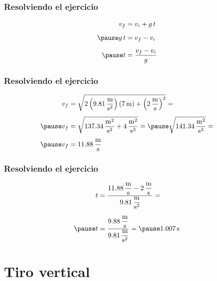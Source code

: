 \documentclass[14pt]{beamer}
\begin{document}
\begin{frame}
\frametitle{Resolviendo el ejercicio}
\vspace*{-1cm}
\begin{eqnarray*}
\begin{aligned}
v_{f} &= v_{i} + g \, t \\[0.5em] \pause
g \, t &= v_{f} - v_{i} \\[0.5em] \pause
t &= \dfrac{v_{f} - v_{i}}{g}
\end{aligned}
\end{eqnarray*}
\end{frame}
\begin{frame}
\frametitle{Resolviendo el ejercicio}
\vspace*{-1.5cm}
\pause
\begin{eqnarray*}
\begin{aligned}
v_{f} &= \sqrt{2 \left( \SI[per-mode=fraction]{9.81}{\meter\per\square\second}  \right) \left( \SI{7}{\meter} \right) + \left( \SI[per-mode=fraction]{2}{\meter\per\second} \right)^{2}} = \\[0.4em] \pause
v_{f} &= \sqrt{\SI[per-mode=fraction]{137.34}{\square\meter\per\square\second} + \SI[per-mode=fraction]{4}{\square\meter\per\square\second}} = \pause \sqrt{\SI[per-mode=fraction]{141.34}{\square\meter\per\square\second}} = \\[0.4em] \pause
v_{f} &= \SI[per-mode=fraction]{11.88}{\meter\per\second}
\end{aligned}
\end{eqnarray*}
\end{frame}
\begin{frame}
\frametitle{Resolviendo el ejercicio}
\pause
\begin{eqnarray*}
\begin{aligned}
t &= \dfrac{\displaystyle \SI[per-mode=fraction]{11.88}{\meter\per\second} - \SI[per-mode=fraction]{2}{\meter\per\second}}{\displaystyle \SI[per-mode=fraction]{9.81}{\meter\per\square\second}} = \\[0.6em] \pause
t &= \dfrac{\displaystyle \SI[per-mode=fraction]{9.88}{\meter\per\second}}{\displaystyle \SI[per-mode=fraction]{9.81}{\meter\per\square\second}} = \pause \SI{1.007}{\second}
\end{aligned}
\end{eqnarray*}
\end{frame}

\section{Tiro vertical}
\end{document}
